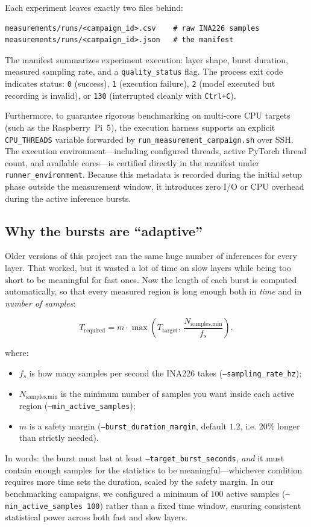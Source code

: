 Each experiment leaves exactly two files behind:

\begin{lstlisting}
measurements/runs/<campaign_id>.csv    # raw INA226 samples
measurements/runs/<campaign_id>.json   # the manifest
\end{lstlisting}

The manifest summarizes experiment execution: layer shape, burst duration, measured sampling rate, and a \texttt{quality\_status} flag. The process exit code indicates status: \texttt{0} (success), \texttt{1} (execution failure), \texttt{2} (model executed but recording is invalid), or \texttt{130} (interrupted cleanly with \texttt{Ctrl+C}).

Furthermore, to guarantee rigorous benchmarking on multi-core CPU targets (such as the Raspberry~Pi~5), the execution harness supports an explicit \texttt{CPU\_THREADS} variable forwarded by \texttt{run\_measurement\_campaign.sh} over SSH. The execution environment---including configured threads, active PyTorch thread count, and available cores---is certified directly in the manifest under \texttt{runner\_environment}. Because this metadata is recorded during the initial setup phase outside the measurement window, it introduces zero I/O or CPU overhead during the active inference bursts.

\subsection{Why the bursts are ``adaptive''} \label{subsec:adaptive_burst}

Older versions of this project ran the same huge number of inferences for every layer. That worked, but it wasted a lot of time on slow layers while being too short to be meaningful for fast ones. Now the length of each burst is computed automatically, so that every measured region is long enough both in \emph{time} and in \emph{number of samples}:

$$
T_{\text{required}} =
m \cdot \max\!\left(T_{\text{target}},\,
\frac{N_{\text{samples,min}}}{f_s}\right),
$$

where:
\begin{itemize}
    \item $f_s$ is how many samples per second the INA226 takes
    (\texttt{--sampling\_rate\_hz});
    \item $N_{\text{samples,min}}$ is the minimum number of samples you want
    inside each active region (\texttt{--min\_active\_samples});
    \item $m$ is a safety margin (\texttt{--burst\_duration\_margin},
    default $1.2$, i.e. 20\% longer than strictly needed).
\end{itemize}
In words: the burst must last at least \texttt{--target\_burst\_seconds}, \emph{and} it must contain enough samples for the statistics to be meaningful---whichever condition requires more time sets the duration, scaled by the safety margin. In our benchmarking campaigns, we configured a minimum of $100$ active samples (\texttt{--min\_active\_samples 100}) rather than a fixed time window, ensuring consistent statistical power across both fast and slow layers.

